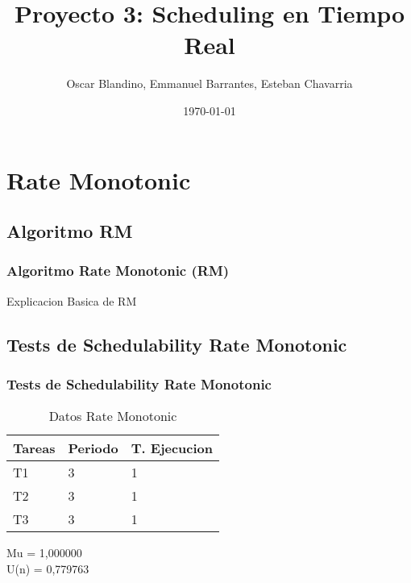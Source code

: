 \documentclass[xcolor=table]{beamer}
\title[Proyecto 3]{Proyecto 3: Scheduling en Tiempo Real} %
\author{Oscar Blandino, Emmanuel Barrantes, Esteban Chavarria} %
\institute[TEC] %
{
Tecnologico de Costa Rica \\ %
Sistemas Operativos Avanzados \\
I Semestre - 2018
\medskip
\textit{} %
}
\date{\today} %
\begin{document}
\begin{frame}
\titlepage %
\end{frame}



\section{Rate Monotonic}

\subsection{Algoritmo RM}

\begin{frame} 
\frametitle{Algoritmo Rate Monotonic (RM)} 
Explicacion Basica de RM \\
\end{frame}

\subsection{Tests de Schedulability  Rate Monotonic } 

\begin{frame} 
\frametitle{Tests de Schedulability  Rate Monotonic } 
\begin{table} 
\centering 
\begin{tabular}{|l|l|l|} 
\hline 
Tareas & Periodo & T. Ejecucion \\ \hline 
T1   & 3  &  1\\ \hline 
T2   & 3  &  1\\ \hline 
T3   & 3  &  1\\ \hline 
\end{tabular} 
\caption{Datos  Rate Monotonic } 
\end{table} 
Mu =  1,000000 \\ 
U(n) =  0,779763 \\ 
\end{frame} 
\end{document}
